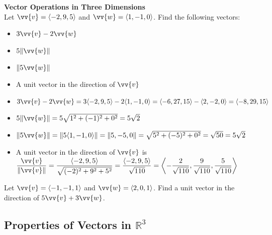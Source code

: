 \documentclass{article}
\begin{document}
\begin{examplebox}
    \textbf{Vector Operations in Three Dimensions} \\
    Let \(\vv{v} = \langle -2, 9, 5 \rangle\) and \(\vv{w} = \langle 1, -1, 0 \rangle\). Find the following vectors:
    \begin{itemize}
        \item \(3\vv{v} - 2\vv{w}\)
        \item \(5\|\vv{w}\|\)
        \item \(\|5\vv{w}\|\)
        \item A unit vector in the direction of \(\vv{v}\)
    \end{itemize}

    \begin{solutionbox}
        \begin{itemize}
            \item \(3\vv{v} - 2\vv{w} = 3\langle -2, 9, 5 \rangle - 2\langle 1, -1, 0 \rangle = \langle -6, 27, 15 \rangle - \langle 2, -2, 0 \rangle = \langle -8, 29, 15 \rangle\)
            \item \(5\|\vv{w}\| = 5\sqrt{1^2 + (-1)^2 + 0^2} = 5\sqrt{2}\)
            \item \(\|5\vv{w}\| = \|5 \langle 1, -1, 0 \rangle\| = \|5, -5, 0\| = \sqrt{5^2 + (-5)^2 + 0^2} = \sqrt{50} = 5\sqrt{2}\)
            \item A unit vector in the direction of \(\vv{v}\) is \(\dfrac{\vv{v}}{\|\vv{v}\|} = \dfrac{\langle -2, 9, 5 \rangle}{\sqrt{(-2)^2 + 9^2 + 5^2}} = \dfrac{\langle -2, 9, 5 \rangle}{\sqrt{110}} = \left\langle -\dfrac{2}{\sqrt{110}}, \dfrac{9}{\sqrt{110}}, \dfrac{5}{\sqrt{110}} \right\rangle\)
        \end{itemize}
    \end{solutionbox}
\end{examplebox}

\begin{exercisebox}
    Let \(\vv{v} = \langle -1, -1, 1 \rangle\) and \(\vv{w} = \langle 2, 0, 1 \rangle\). Find a unit vector in the direction of \(5\vv{v} + 3\vv{w}\).
\end{exercisebox}

\subsection*{Properties of Vectors in \(\mathbb{R}^3\)}
\end{document}
